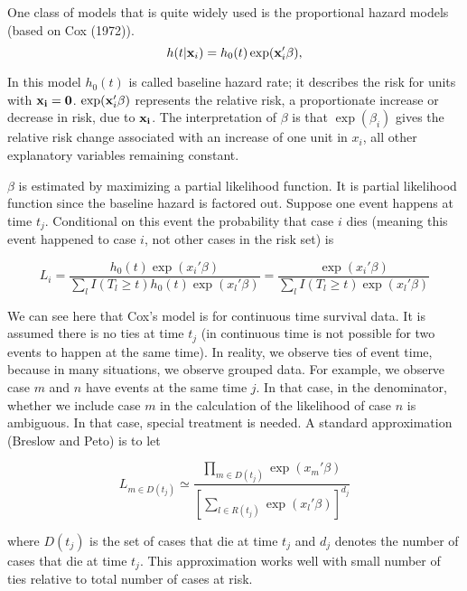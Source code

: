 One class of models that is quite widely used is the proportional
hazard models (based on Cox (1972)).
\begin{equation}
h(t | {\bf x}_i)=h_0(t)\exp ({\bf x}'_i \beta),
\label{cox1}
\end{equation}

In this model $h_0(t)$ is called baseline hazard rate; it describes
the risk for units with $\bf x_i = 0$. $\exp ({\bf x}'_i \beta)$
represents the relative risk, a proportionate increase or decrease in
risk, due to $\bf x_i$.  The interpretation of $\beta$ is that
$\exp(\beta_i)$ gives the relative risk change associated with an
increase of one unit in $x_i$, all other explanatory variables remaining
constant.

$\beta$ is estimated by maximizing a partial likelihood function.  It
is partial likelihood function since the baseline hazard is factored
out.  Suppose one event happens at time $t_j$.  Conditional on this
event the probability that case $i$ dies (meaning this event happened
to case $i$, not other cases in the risk set) is


\begin{equation}
L_i=\frac{h_0(t) \exp(x_i' \beta)} {\sum_l I(T_l \ge t) h_0(t) \exp(x_l' \beta)}=\frac{ \exp(x_i' \beta)} {\sum_l I(T_l \ge t)  \exp(x_l' \beta)}
\end{equation}

We can see here that Cox's model is for continuous time survival data.
It is assumed there is no ties at time $t_j$ (in continuous time is
not possible for two events to happen at the same time).  In reality,
we observe ties of event time, because in many situations, we observe
grouped data.  For example, we observe case $m$ and $n$ have events at
the same time $j$.  In that case, in the denominator, whether we include
case $m$ in the calculation of the likelihood of case $n$ is
ambiguous.  In that case, special treatment is needed.  A standard
approximation (Breslow and Peto) is to let

\begin{equation}
L_{m \in D(t_j)} \simeq \frac{ \prod_{m \in D(t_j)} \exp(x_m' \beta)} {[\sum_{l \in R(t_j)} \exp(x_l' \beta)]^{d_j}}
\end{equation}

where $D(t_j)$ is the set of cases that die at time $t_j$ and $d_j$
denotes the number of cases that die at time $t_j$.  This
approximation works well with small number of ties relative to total
number of cases at risk.


